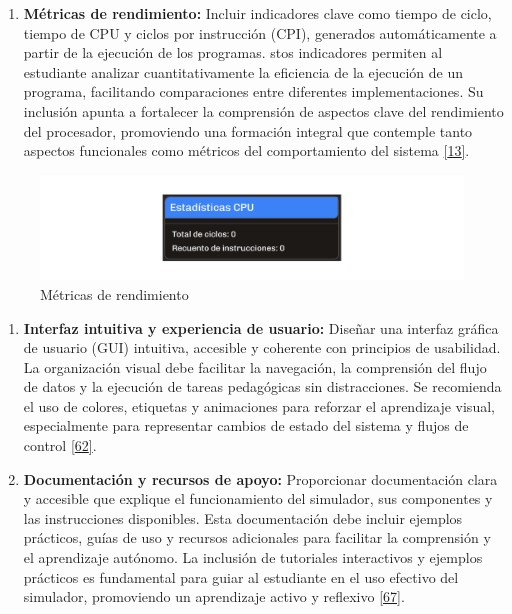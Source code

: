 \documentclass[12pt,oneside]{templates/unerthesis}
\providecommand{\tightlist}{%
  \setlength{\itemsep}{0pt}\setlength{\parskip}{0pt}}
\begin{document}
\begin{enumerate}
\def\labelenumi{\arabic{enumi}.}
\setcounter{enumi}{5}
\tightlist
\item
  \textbf{Métricas de rendimiento:}
  Incluir indicadores clave como tiempo de ciclo, tiempo de CPU y ciclos por instrucción (CPI), generados automáticamente a partir de la ejecución de los programas. stos indicadores permiten al estudiante analizar cuantitativamente la eficiencia de la ejecución de un programa, facilitando comparaciones entre diferentes implementaciones. Su inclusión apunta a fortalecer la comprensión de aspectos clave del rendimiento del procesador, promoviendo una formación integral que contemple tanto aspectos funcionales como métricos del comportamiento del sistema \protect\hyperlink{ref-hennessy2017computer}{{[}13{]}}.
\end{enumerate}

\begin{figure}

{\centering \includegraphics[width=0.85\linewidth]{images/metricas} 

}

\caption{Métricas de rendimiento}\label{fig:metricas}
\end{figure}

\begin{enumerate}
\def\labelenumi{\arabic{enumi}.}
\setcounter{enumi}{6}
\item
  \textbf{Interfaz intuitiva y experiencia de usuario:}
  Diseñar una interfaz gráfica de usuario (GUI) intuitiva, accesible y coherente con principios de usabilidad. La organización visual debe facilitar la navegación, la comprensión del flujo de datos y la ejecución de tareas pedagógicas sin distracciones. Se recomienda el uso de colores, etiquetas y animaciones para reforzar el aprendizaje visual, especialmente para representar cambios de estado del sistema y flujos de control \protect\hyperlink{ref-w3c_accessibility_2021}{{[}62{]}}.
\item
  \textbf{Documentación y recursos de apoyo:}
  Proporcionar documentación clara y accesible que explique el funcionamiento del simulador, sus componentes y las instrucciones disponibles. Esta documentación debe incluir ejemplos prácticos, guías de uso y recursos adicionales para facilitar la comprensión y el aprendizaje autónomo. La inclusión de tutoriales interactivos y ejemplos prácticos es fundamental para guiar al estudiante en el uso efectivo del simulador, promoviendo un aprendizaje activo y reflexivo \protect\hyperlink{ref-bonwell1991active}{{[}67{]}}.
\end{enumerate}
\end{document}
